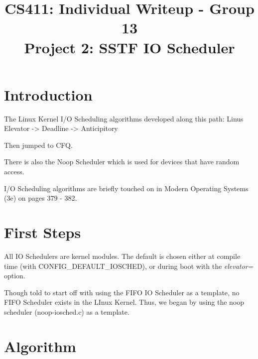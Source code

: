 \documentclass[letterpaper,10pt,titlepage]{article}
\title{CS411: Individual Writeup - Group 13\\
    Project 2: SSTF IO Scheduler}
\date{}
\author{\name}
\begin{document}
\maketitle

\tableofcontents

\section{Introduction}

The Linux Kernel I/O Scheduling algorithms developed along this path:
Linus Elevator -> Deadline -> Anticipitory

Then jumped to CFQ.

There is also the Noop Scheduler which is used for devices that have
random access.

I/O Scheduling algorithms are briefly touched on in Modern Operating
Systems (3e) on pages 379 - 382.

\section{First Steps}

All IO Schedulers are kernel modules. The default is chosen either at
compile time (with CONFIG\_DEFAULT\_IOSCHED), or during boot with the
\emph{elevator=} option.

Though told to start off with using the FIFO IO Scheduler as a template,
no FIFO Scheduler exists in the LInux Kernel. Thus, we began by using
the noop scheduler (noop-iosched.c) as a template.

\section{Algorithm}
\end{document}
